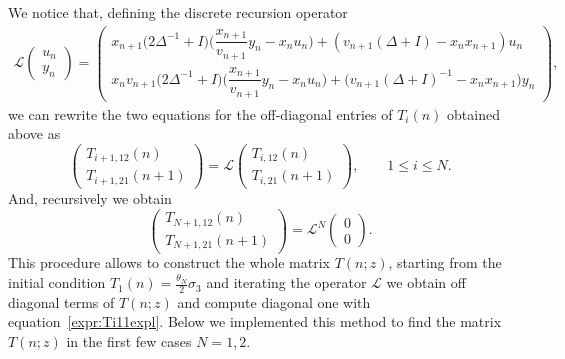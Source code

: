 \documentclass[pdftex]{sigma}%
\numberwithin{equation}{section}
\begin{document}
We notice that, defining the discrete recursion operator
	\begin{gather}
		\label{L}
		\mathcal{L}\begin{pmatrix}u_n\\y_n\end{pmatrix}
=\begin{pmatrix}
			x_{n+1}\big(2\Delta^{-1}+I\big)\bigg(\dfrac{x_{n+1}}{v_{n+1}} y_n-x_nu_n\bigg)+(v_{n+1}(\Delta+I)-x_nx_{n+1})u_n
\\[4mm]
			x_nv_{n+1}\big(2\Delta^{-1}\!+\!I\big)\bigg(\dfrac{x_{n+1}}{v_{n+1}} y_n\!-\!x_nu_n\bigg)\!+\!\big(v_{n+1}(\Delta+I)^{-1}\!-\!x_nx_{n+1}\big)y_n
		\end{pmatrix}\!,
	\end{gather}
	we can rewrite the two equations for the off-diagonal entries of $T_i(n)$ obtained above as
	\begin{equation}
	\label{LTiTi+1}
	\begin{pmatrix}
		T_{i+1,12}(n)\\
		T_{i+1,21}(n+1)
	\end{pmatrix}=\mathcal{L}\begin{pmatrix}
		T_{i,12}(n)\\
		T_{i,21}(n+1)
	\end{pmatrix}\!,\qquad 1\leqslant i\leqslant N.
	\end{equation}
	And, recursively we obtain
	\begin{equation}
		\label{TN+11221}
		\begin{pmatrix}
			T_{N+1,12}(n)\\
			T_{N+1,21}(n+1)
		\end{pmatrix}={\mathcal{L}}^N\begin{pmatrix}
			0\\
			0
		\end{pmatrix}\!.
	\end{equation}
	This procedure allows to construct the whole matrix $T(n;z)$, starting from the initial condition $T_1(n)=\frac{\theta_N}{2}\sigma_3$ and iterating the operator $\mathcal{L}$ we obtain off diagonal terms of $T(n;z)$ and compute diagonal one with equation~\eqref{expr:Ti11expl}.
	Below we implemented this method to find the matrix $T(n;z)$ in the first few cases $N=1,2$.
\end{document}
